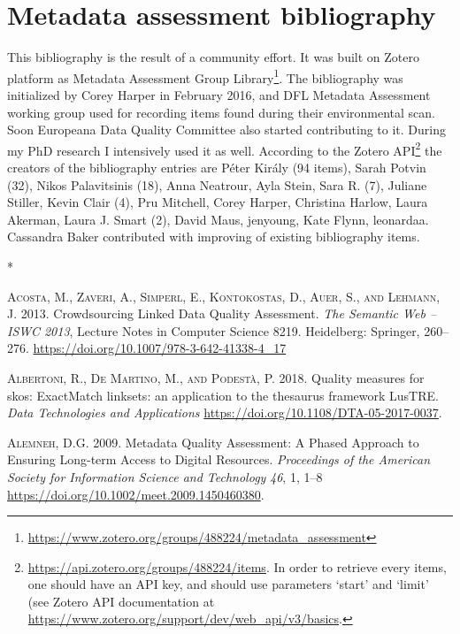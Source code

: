 \chapter{Metadata assessment bibliography}


This bibliography is the result of a community effort. It was built on Zotero platform as Metadata Assessment Group Library\footnote{\url{https://www.zotero.org/groups/488224/metadata_assessment}}. The bibliography was initialized by Corey Harper in February 2016, and DFL Metadata Assessment working group used for recording items found during their environmental scan. Soon Europeana Data Quality Committee also started contributing to it. During my PhD research I intensively used it as well. According to the Zotero API\footnote{\url{https://api.zotero.org/groups/488224/items}. In order to retrieve every items, one should have an API key, and should use parameters `start' and `limit' (see Zotero API documentation at \url{https://www.zotero.org/support/dev/web_api/v3/basics}.} the creators of the bibliography entries are Péter Király (94 items), Sarah Potvin (32), Nikos Palavitsinis (18), Anna Neatrour, Ayla Stein, Sara R. (7), Juliane Stiller, Kevin Clair (4), Pru Mitchell, Corey Harper, Christina Harlow, Laura Akerman, Laura J. Smart (2), David Maus, jenyoung, Kate Flynn, leonardaa. Cassandra Baker contributed with improving of existing bibliography items.

\begin{center}
    *
\end{center}

\textsc{Acosta, M., Zaveri, A., Simperl, E., Kontokostas, D., Auer, S., and Lehmann, J.} 2013. Crowdsourcing Linked Data Quality Assessment. \emph{The Semantic Web – ISWC 2013}, Lecture Notes in Computer Science 8219. Heidelberg: Springer, 260–276. \url{https://doi.org/10.1007/978-3-642-41338-4_17}

\textsc{Albertoni, R., De Martino, M., and Podestà, P.} 2018. Quality measures for skos: ExactMatch linksets: an application to the thesaurus framework LusTRE. \emph{Data Technologies and Applications} \url{https://doi.org/10.1108/DTA-05-2017-0037}.

\textsc{Alemneh, D.G.} 2009. Metadata Quality Assessment: A Phased Approach to Ensuring Long-term Access to Digital Resources. \emph{Proceedings of the American Society for Information Science and Technology} \emph{46}, 1, 1–8 \url{https://doi.org/10.1002/meet.2009.1450460380}.


